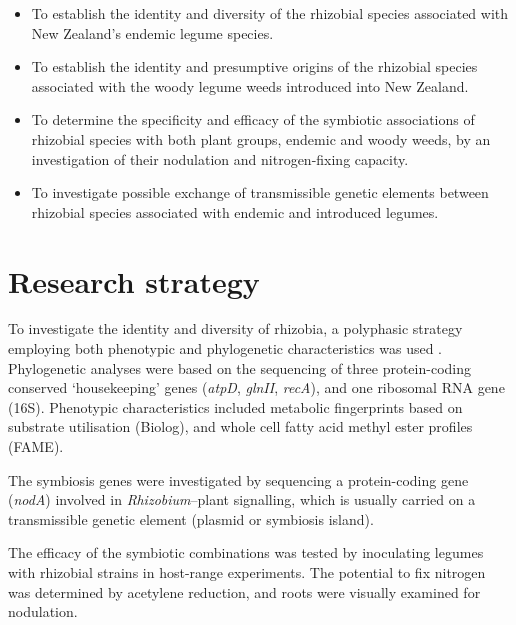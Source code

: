 \begin{itemize}

\item To establish the identity and diversity of the rhizobial species associated
with New Zealand's endemic legume species.

\item To establish the identity and presumptive origins of the rhizobial species
associated with the woody legume weeds introduced into New Zealand.

\item To determine the specificity and efficacy of the symbiotic associations of
rhizobial species  with both plant groups, endemic and woody weeds,
by an investigation of their nodulation and nitrogen-fixing
capacity.

\item To investigate possible exchange of transmissible genetic elements
between rhizobial species associated with endemic and introduced
legumes.

\end{itemize}


\section{Research strategy}

To investigate the identity and diversity of rhizobia, a polyphasic
strategy employing both phenotypic and phylogenetic characteristics
was used \citep{Vandamme96}. Phylogenetic analyses were based on the
sequencing of three protein-coding conserved `housekeeping' genes
(\emph{atpD}, \emph{glnII}, \emph{recA}), and one ribosomal RNA gene
(16S). Phenotypic characteristics included metabolic fingerprints
based on substrate utilisation (Biolog), and whole cell fatty acid
methyl ester profiles (FAME).

The symbiosis genes were investigated by sequencing a protein-coding
gene (\emph{nodA}) involved in \emph{Rhizobium}--plant signalling,
which is usually carried on a transmissible genetic element (plasmid
or symbiosis island).

The efficacy of the symbiotic combinations was tested by inoculating
legumes with rhizobial strains in host-range experiments. The
potential to fix nitrogen was determined by acetylene reduction, and
roots were visually examined for nodulation.





